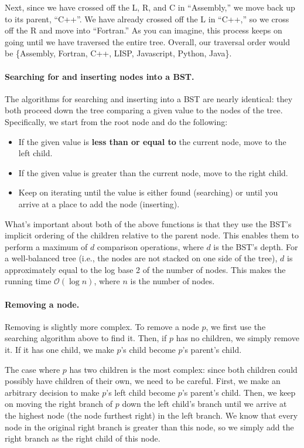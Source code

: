 \documentclass{pset_template}
\begin{document}
Next, since we have crossed off the L, R, and C in ``Assembly,''
we move back up to its parent, ``C++''.
We have already crossed off the L in ``C++,'' so we cross off the R and move
into ``Fortran.''
As you can imagine, this process keeps on going until we have traversed
the entire tree.
Overall, our traversal order would be \{Assembly, Fortran, C++, LISP,
Javascript, Python, Java\}.

\paragraph{Searching for and inserting nodes into a BST.}
The algorithms for searching and inserting into a BST are nearly identical:
they both proceed down the tree comparing a given value to the nodes of the tree.
Specifically, we start from the root node and do the following:
\begin{itemize}
\item If the given value is \textbf{less than or equal to} the current node, move
to the left child.
\item If the given value is greater than the current node, move to the right child.
\item Keep on iterating until the value is either found (searching) or
until you arrive at a place to add the node (inserting).
\end{itemize}

What's important about both of the above functions is that they use
the BST's implicit ordering of the children relative to the parent node.
This enables them to perform a maximum of $d$ comparison operations,
where $d$ is the BST's depth.
For a well-balanced tree (i.e., the nodes are not stacked
on one side of the tree), $d$ is approximately equal to the log base 2
of the number of nodes.
This makes the running time $\mathcal{O}(\log{}n)$, where $n$ is the number
of nodes.

\paragraph{Removing a node.}
Removing is slightly more complex.
To remove a node $p$, we first use the searching algorithm above to find it.
Then, if $p$ has no children, we simply remove it.
If it has one child, we make $p$'s child become $p$'s parent's child.

The case where $p$ has two children is the most complex:
since both children could possibly have children of their own, we need to be careful.
First, we make an arbitrary decision to make $p$'s left child become $p$'s parent's child.
Then, we keep on moving the right branch of $p$ down the left child's branch until we
arrive at the highest node (the node furthest right) in the left branch.
We know that every node in the original right branch is greater than this node,
so we simply add the right branch as the right child of this node.
\end{document}
